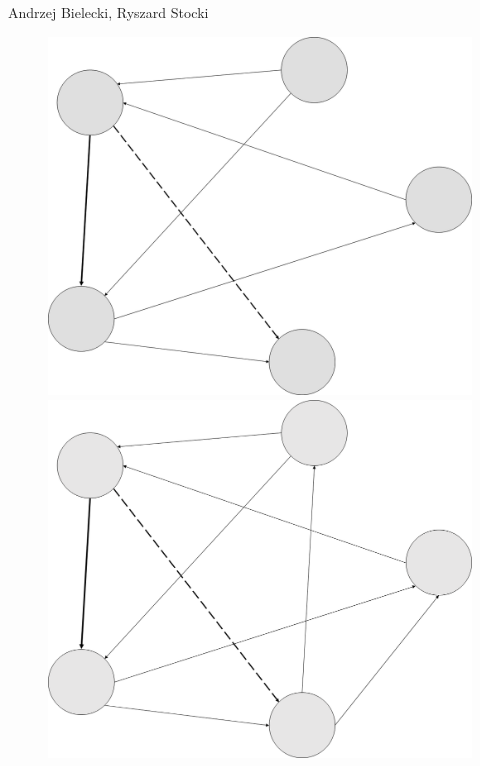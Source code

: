 \begin{artengenv2auth}{Andrzej Bielecki, Ryszard Stocki}
\begin{figure}[htbp]
 \begin{minipage}[b]{.45\textwidth}
   \centering
   \includegraphics[width=\textwidth]{ART_Bielecki/InfoStructcorrectedcopyeditedPP-img004.png}
 \end{minipage}%
 \hfill
 \begin{minipage}[b]{.45\textwidth}
   \centering
   \includegraphics[width=\textwidth]{ART_Bielecki/InfoStructcorrectedcopyeditedPP-img005.png}
 \end{minipage}


\end{figure}
\end{artengenv2auth}
